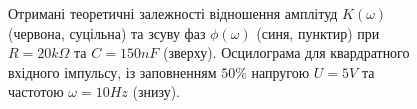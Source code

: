 \begin{figure}[h]
\begin{minipage}[h]{0.47\linewidth}
    \end{minipage}
    \caption{Отримані теоретичні залежності відношення амплітуд $K(\omega)$ (червона, суцільна) та зсуву фаз $\phi(\omega)$ (синя, пунктир) при $R = 20k\Omega$ та $C = 150nF$ (зверху). Осцилограма для квардратного вхідного імпульсу, із заповненням $50\%$ напругою $U=5V$ та частотою $\omega = 10Hz$ (знизу).}
    \label{fig:modkph}
\end{figure}